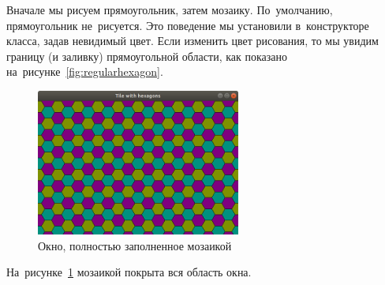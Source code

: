 Вначале мы рисуем прямоугольник, затем мозаику. По~умолчанию, прямоугольник не~рисуется. Это поведение мы установили в~конструкторе класса, задав невидимый цвет. Если изменить цвет рисования, то мы увидим границу (и заливку) прямоугольной области, как показано на~рисунке~\ref{fig:regularhexagon}.

\begin{figure}[ht]
    {\centering
        \includegraphics[width=0.6\textwidth]{images/tile_window.png}

    }
    \caption{Окно, полностью заполненное мозаикой}
    \label{fig:hexagontile}
\end{figure}

На~рисунке~\ref{fig:hexagontile} мозаикой покрыта вся область окна.
